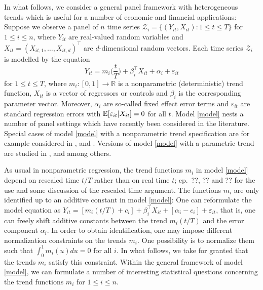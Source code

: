 \documentclass[a4paper,12pt]{article}
\begin{document}
In what follows, we consider a general panel framework with heterogeneous trends which is useful for a number of economic and financial applications: 
Suppose we observe a panel of $n$ time series $\mathcal{Z}_i = \{ (Y_{it},X_{it}): 1 \le t \le T \}$ for $1 \le i \le n$, where $Y_{it}$ are real-valued random variables and $X_{it} = (X_{it,1},\ldots,X_{it,d})^\top$ are $d$-dimensional random vectors. Each time series $\mathcal{Z}_i$ is modelled by the equation
\begin{equation}\label{model}
Y_{it} = m_i \Big( \frac{t}{T} \Big) + \beta_i^\top X_{it} + \alpha_i + \varepsilon_{it}
\end{equation}
for $1 \le t \le T$, where $m_i: [0,1] \rightarrow \mathbb{R}$ is a nonparametric (deterministic) trend function, $X_{it}$ is a vector of regressors or controls and $\beta_i$ is the corresponding parameter vector. Moreover, $\alpha_i$ are so-called fixed effect error terms and $\varepsilon_{it}$ are standard regression errors with $\mathbb{E}[\varepsilon_{it}|X_{it}] = 0$ for all $t$. Model \eqref{model} nests a number of panel settings which have recently been considered in the literature. Special cases of model \eqref{model} with a nonparametric trend specification are for example considered in \cite{Atak2011}, \cite{Zhang2012} and \cite{Hidalgo2014}. Versions of model \eqref{model} with a parametric trend are studied in \cite{Vogelsang2005}, \cite{Sun2011} and \cite{Xu2012} among others.


As usual in nonparametric regression, the trend functions $m_i$ in model \eqref{model} depend on rescaled time $t/T$ rather than on real time $t$; cp.\ ??, ?? and ?? for the use and some discussion of the rescaled time argument. The functions $m_i$ are only identified up to an additive constant in model \eqref{model}: One can reformulate the model equation as $Y_{it} = [m_i(t/T) + c_i] + \beta_i^\top X_{it} + [\alpha_i - c_i] + \varepsilon_{it}$, that is, one can freely shift additive constants between the trend $m_i(t/T)$ and the error component $\alpha_i$. In order to obtain identification, one may impose different normalization constraints on the trends $m_i$. One possibility is to normalize them such that $\int_0^1 m_i(u) du = 0$ for all $i$. In what follows, we take for granted that the trends $m_i$ satisfy this constraint. 
Within the general framework of model \eqref{model}, we can formulate a number of interesting statistical questions concerning the trend functions $m_i$ for $1 \le i \le n$. 
\vspace{15pt}
\end{document}
